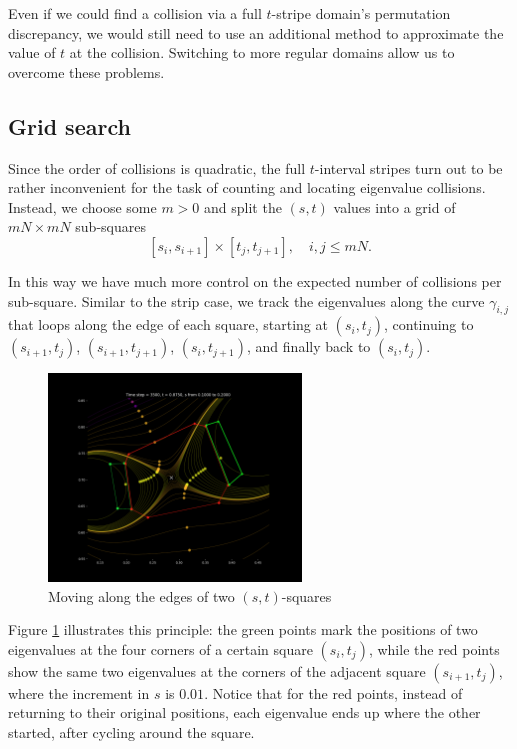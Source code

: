 \documentclass{article}
\begin{document}
	Even if we could find a collision via a full $t$-stripe domain's permutation discrepancy, 
	we would still need to use an additional method to approximate the value of $t$
	at the collision. Switching to more regular domains allow us to overcome these problems.

	\subsection{Grid search} \label{subsection:grid-search}
	
	Since the order of collisions is quadratic, 
	the full $t$-interval stripes turn out to be rather inconvenient 
	for the task of counting and locating eigenvalue collisions. 
	Instead, we choose some $m > 0$ and split the $(s,t)$ values into a grid of $mN \times mN$ sub-squares
	$$[s_i, s_{i+1}] \times [t_j, t_{j+1}], \quad i, j \leq mN.$$ 

	In this way we have much more control on the expected number of collisions 
	per sub-square. Similar to the strip case, we track the eigenvalues along the curve $\gamma_{i,j}$ 
	that loops along the edge of each square, starting at $(s_i, t_j)$, 
	continuing to $(s_{i+1}, t_j)$, $(s_{i+1}, t_{j+1})$, $(s_i, t_{j+1})$, 
	and finally back to $(s_i, t_j)$.
	
	\begin{figure}[htbp]
		\centering
		\includegraphics[width=0.6\textwidth]{figures/Rectangles.pdf}
		\caption{Moving along the edges of two $(s,t)$-squares}
		\label{fig:subsquare}
	\end{figure}

	Figure \ref{fig:subsquare} illustrates this principle: the green points mark the positions 
	of two eigenvalues at the four corners of a certain square $(s_i,t_j)$, 
	while the red points show the same two eigenvalues at the corners of the adjacent square 
	$(s_{i+1},t_j)$, where the increment in $s$ is $0.01$. 
	Notice that for the red points, instead of returning to their original positions, 
	each eigenvalue ends up where the other started, 
	after cycling around the square. 
	
\end{document}
